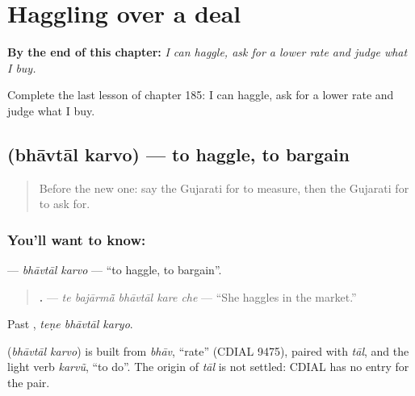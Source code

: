 
\chapter{Haggling over a deal}
\label{ch:gu-haggling-over-a-deal}

\begin{chapteropening}
\textbf{By the end of this chapter:} \emph{I can haggle, ask for a lower rate and judge what I buy.}

Complete the last lesson of chapter 185: I can haggle, ask for a lower rate and judge what I buy.
\end{chapteropening}

\section[\texorpdfstring{\gu{ભાવતાલ} \gu{કરવો} (bhāvtāl karvo)}{ભાવતાલ કરવો (bhāvtāl karvo)}]{  (bhāvtāl karvo) — to haggle, to bargain}

\label{lesson:GU-C185-bhavtal-karvo}



\begin{quote}
Before the new one: say the Gujarati for to measure, then the Gujarati for to ask for.
\end{quote}

\subsection*{You'll want to know:  }
\textbf{ } — \emph{bhāvtāl karvo} — \textquotedblleft{}to haggle, to bargain\textquotedblright{}.

\begin{quote}
\textbf{    .} — \emph{te bajārmā̃ bhāvtāl kare che} — \textquotedblleft{}She haggles in the market.\textquotedblright{}
\end{quote}

Past \textbf{  }, \emph{teṇe bhāvtāl karyo}.

\begin{cousinweb}
\textbf{ } (\emph{bhāvtāl karvo}) is built from \emph{bhāv}, \textquotedblleft{}rate\textquotedblright{} (CDIAL 9475), paired with \emph{tāl}, and the light verb \emph{karvũ}, \textquotedblleft{}to do\textquotedblright{}. The origin of \emph{tāl} is not settled: CDIAL has no entry for the pair.
\end{cousinweb}

